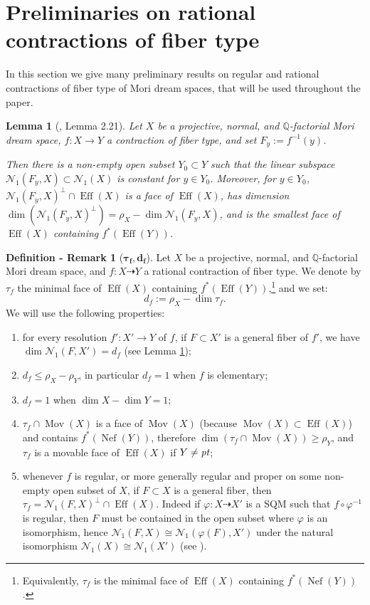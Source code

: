 \documentclass[a4paper,12pt]{amsart}
\newtheorem{lemma}[thm]{Lemma}
\theoremstyle{definition}
\newtheorem{remdefi}[thm]{Definition - Remark}
\numberwithin{figure}{section}
\numberwithin{table}{section}
\newcommand{\ph}{\varphi}
\newcommand{\Q}{\mathbb{Q}}
\newcommand{\N}{\mathcal{N}_1}
\newcommand{\Eff}{\operatorname{Eff}}
\newcommand{\Nef}{\operatorname{Nef}}
\newcommand{\Mov}{\operatorname{Mov}}
\newcommand{\pt}{\text{\it pt}}
\begin{document}
\section{Preliminaries on rational contractions of fiber type}\label{ratfibertype}
\noindent In this section we give many preliminary results on regular and rational contractions of fiber type of Mori dream spaces, that will be used throughout the paper.
\begin{lemma}[\cite{eff}, Lemma 2.21]\label{general}
      Let $X$ be a projective, normal, and $\Q$-factorial Mori dream space, $f\colon X\to Y$ a contraction of fiber type, and set  $F_y:=f^{-1}(y)$.

      Then there is a non-empty open subset $Y_0\subset Y$ such that the linear subspace $\N(F_y,X)\subset\N(X)$ is constant for $y\in Y_0$.
Moreover, for $y\in Y_0$,
       $\N(F_y,X)^{\perp}\cap\Eff(X)$
 is a face of $\Eff(X)$, has dimension  $\dim(\N(F_y,X)^{\perp})=\rho_X-\dim\N(F_y,X)$, and is the smallest face of $\Eff(X)$ containing $f^*(\Eff(Y))$.
\end{lemma}
\begin{remdefi}[$\boldsymbol{\tau_f,d_f}$]\label{dimfiber}
 Let $X$ be a projective, normal, and $\Q$-factorial Mori dream space, and $f\colon X\dasharrow Y$ a rational contraction of fiber type. We denote by 
 $\tau_f$ the minimal face of $\Eff(X)$ containing $f^*(\Eff(Y))$,\footnote{Equivalently, $\tau_f$ is the minimal face of $\Eff(X)$ containing $f^*(\Nef(Y))$.} and we set:
 $$d_f:=\rho_X-\dim\tau_f.$$
 We will use the following properties:
 \begin{enumerate}[$\bullet$]
   \item
  for every resolution
  $f'\colon X'\to Y$ of $f$, if $F\subset X'$ is a general fiber of $f'$, we have $\dim\N(F,X')=d_f$ (see Lemma \ref{general});
\item $d_f\leq\rho_X-\rho_Y$, in particular $d_f=1$ when $f$ is elementary;
\item $d_f=1$ when $\dim X-\dim Y=1$;
\item $\tau_f\cap\Mov(X)$ is a face of $\Mov(X)$ (because $\Mov(X)\subset\Eff(X)$) and contains $f^*(\Nef(Y))$, therefore $\dim(\tau_f\cap\Mov(X))\geq\rho_Y$, and $\tau_f$ is a movable face of $\Eff(X)$ if $Y\neq \pt$;
\item whenever $f$ is regular, or more generally regular and proper on some non-empty open subset of $X$, if $F\subset X$ is a general fiber, then $\tau_f=\N(F,X)^{\perp}\cap\Eff(X)$.
  Indeed if $\ph\colon X\dasharrow X'$ is a SQM such that $f\circ\ph^{-1}$ is regular, then $F$ must be contained in the open subset where $\ph$ is an isomorphism, hence $\N(F,X)\cong\N(\ph(F),X')$ under the natural isomorphism $\N(X)\cong\N(X')$
  (see \cite[Lemma 2.17]{fibrations}).
 \end{enumerate}
\end{remdefi}
\end{document}
